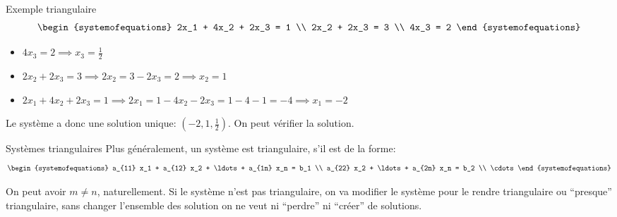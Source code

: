 \documentclass{article}
\begin{document}
\begin{parag}{Exemple triangulaire}
   \[\begin{systemofequations}
   2x_1 + 4x_2 + 2x_3 = 1 \\
   2x_2 + 2x_3 = 3 \\
   4x_3 = 2
   \end{systemofequations}\]

   \begin{itemize}[left=0pt]
       \item $4x_3 = 2 \implies x_3 = \frac{1}{2}$
       \item $2x_2 + 2x_3 = 3 \implies 2x_2 = 3 - 2x_3 = 2 \implies x_2 = 1$
       \item $2x_1 + 4x_2 + 2x_3 = 1 \implies 2x_1 = 1 - 4x_2 - 2x_3 = 1 - 4 - 1 = -4 \implies x_1 = -2$
   \end{itemize}

   Le système a donc une solution unique: $\left(-2, 1, \frac{1}{2}\right)$. On peut vérifier la solution.
\end{parag}

\begin{parag}{Systèmes triangulaires}
    Plus généralement, un système est triangulaire, s'il est de la forme:
    \[\begin{systemofequations}
    a_{11} x_1 + a_{12} x_2 + \ldots + a_{1n} x_n = b_1 \\
    a_{22} x_2 + \ldots + a_{2n} x_n = b_2  \\
    \cdots
    \end{systemofequations}\]

    On peut avoir $m \neq n$, naturellement. Si le système n'est pas triangulaire, on va modifier le système pour le rendre triangulaire ou ``presque'' triangulaire, sans changer l'ensemble des solution on ne veut ni ``perdre'' ni ``créer'' de solutions.
\end{parag}
\end{document}
